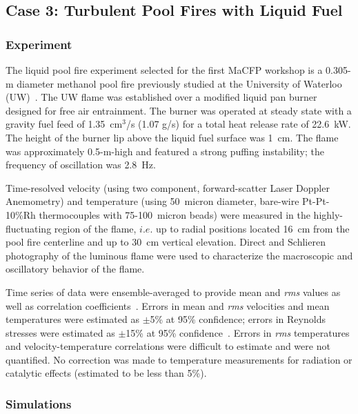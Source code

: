 
\subsection{Case 3: Turbulent Pool Fires with Liquid Fuel} \label{sec:liquid_pool_fires}

\subsubsection{Experiment}

The liquid pool fire experiment selected for the first MaCFP workshop is a 0.305-m diameter methanol pool fire previously studied at the University of Waterloo (UW)~\cite{Case3_EXP_1,Case3_EXP_2}. The UW flame was established over a modified liquid pan burner designed for free air entrainment. The burner was operated at steady state with a gravity fuel feed of 1.35~cm$^3$/s (1.07 g/s) for a total heat release rate of 22.6~kW. The height of the burner lip above the liquid fuel surface was 1~cm. The flame was approximately 0.5-m-high and featured a strong puffing instability; the frequency of oscillation was 2.8~Hz.

Time-resolved velocity (using two component, forward-scatter Laser Doppler Anemometry) and temperature (using 50~micron diameter, bare-wire Pt-Pt-10\%Rh thermocouples with 75-100~micron beads) were measured in the highly-fluctuating region of the flame, $i.e.$ up to radial positions located 16~cm from the pool fire centerline and up to 30~cm vertical elevation. Direct and Schlieren photography of the luminous flame were used to characterize the macroscopic and oscillatory behavior of the flame.

Time series of data were ensemble-averaged to provide mean and {\it rms} values as well as correlation coefficients~\cite{Case3_EXP_2}. Errors in mean and {\it rms} velocities and mean temperatures were estimated as $\pm$5\% at 95\% confidence; errors in Reynolds stresses were estimated as $\pm$15\% at 95\% confidence~\cite{Case3_EXP_1}. Errors in {\it rms} temperatures and velocity-temperature correlations were difficult to estimate and were not quantified. No correction was made to temperature measurements for radiation or catalytic effects (estimated to be less than 5\%).

\subsubsection{Simulations}

